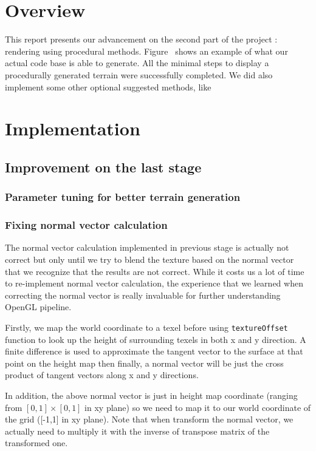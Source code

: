 \documentclass[a4paper,11pt]{article}
\begin{document}
\section{Overview}

This report presents our advancement on the second part of the project : rendering using procedural methods. Figure~ shows an example of what our actual code base is able to generate. All the minimal steps to display a procedurally generated terrain were successfully completed. We did also implement some other optional suggested methods, like 


\section{Implementation}

\subsection{Improvement on the last stage}

\subsubsection{Parameter tuning for better terrain generation}

\subsubsection{Fixing normal vector calculation}
The normal vector calculation implemented in previous stage is actually not correct but only until we try to blend the texture based on the normal vector that we recognize that the results are not correct. While it costs us a lot of time to re-implement normal vector calculation, the experience that we learned when correcting the normal vector is really invaluable for further understanding OpenGL pipeline.

Firstly, we map the world coordinate to a texel before using \texttt{textureOffset} function to look up the height of surrounding texels in both x and y direction. A finite difference is used to approximate the tangent vector to the surface at that point on the height map then finally, a normal vector will be just the cross product of tangent vectors along x and y directions.

In addition, the above normal vector is just in height map coordinate (ranging from $[0,1] \times [0,1]$ in xy plane) so we need to map it to our world coordinate of the grid ([-1,1] in xy plane). Note that when transform the normal vector, we actually need to multiply it with the inverse of transpose matrix of the transformed one.
\end{document}
